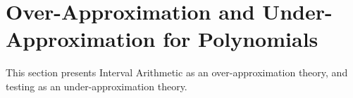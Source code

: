 \chapter{Over-Approximation and Under-Approximation for Polynomials}
This section presents Interval Arithmetic as an over-approximation theory, and testing as an under-approximation theory.